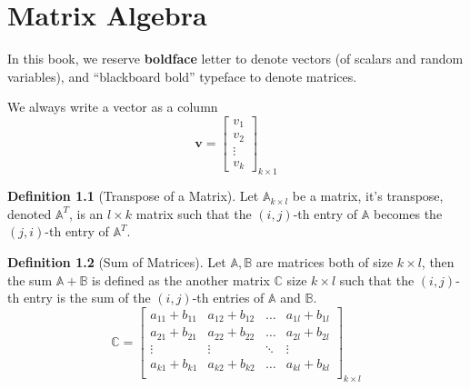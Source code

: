 \documentclass[
]{book}
\theoremstyle{definition}
\newtheorem{definition}{Definition}[chapter]
\theoremstyle{definition}
\theoremstyle{definition}
\theoremstyle{definition}
\theoremstyle{remark}
\begin{document}
\hypertarget{appendix-appendix}{%
\appendix}


\hypertarget{matrix-algebra}{%
\chapter{Matrix Algebra}\label{matrix-algebra}}

In this book, we reserve \textbf{boldface} letter to denote vectors (of scalars and random variables), and ``blackboard bold'' typeface to denote matrices.

We always write a vector as a column
\[
\pmb{v}=\begin{bmatrix}
v_1 \\
v_2 \\
\vdots \\
v_k
\end{bmatrix}_{k\times1}
\]

\begin{definition}[Transpose of a Matrix]
\protect\hypertarget{def:mattrans}{}\label{def:mattrans}Let \(\mathbb{A}_{k\times l}\) be a matrix, it's transpose, denoted \(\mathbb{A}^T\), is an \(l\times k\) matrix such that
the \((i,j)\)-th entry of \(\mathbb{A}\) becomes the \((j,i)\)-th entry of \(\mathbb{A}^T\).
\end{definition}

\begin{definition}[Sum of Matrices]
\protect\hypertarget{def:matsum}{}\label{def:matsum}Let \(\mathbb{A},\mathbb{B}\) are matrices both of size \(k\times l\), then the sum \(\mathbb{A}+\mathbb{B}\) is defined as the another matrix \(\mathbb{C}\) size \(k\times l\) such that the \((i,j)\)-th entry is the sum of the \((i,j)\)-th entries of \(\mathbb A\) and \(\mathbb B\).
\[
  \mathbb{C}=\begin{bmatrix}
  a_{11}+b_{11} & a_{12}+b_{12} & \ldots & a_{1l}+b_{1l} \\
  a_{21}+b_{21} & a_{22}+b_{22} & \ldots & a_{2l}+b_{2l} \\
  \vdots & \vdots & \ddots & \vdots \\
  a_{k1}+b_{k1} & a_{k2}+b_{k2} & \ldots & a_{kl}+b_{kl} \\
  \end{bmatrix}_{k\times l}
  \]
\end{definition}
\end{document}
